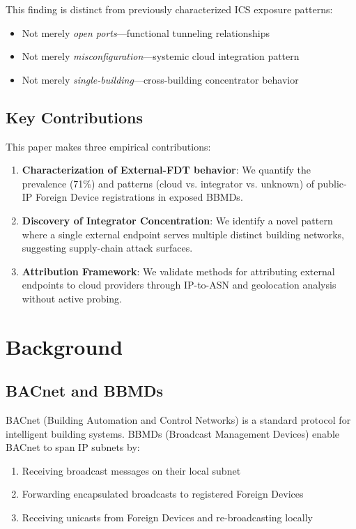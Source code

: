 \documentclass[11pt,a4paper]{article}
\begin{document}
This finding is distinct from previously characterized ICS exposure patterns:
\begin{itemize}
  \item Not merely \emph{open ports}---functional tunneling relationships
  \item Not merely \emph{misconfiguration}---systemic cloud integration pattern
  \item Not merely \emph{single-building}---cross-building concentrator behavior
\end{itemize}

\subsection{Key Contributions}

This paper makes three empirical contributions:

\begin{enumerate}
  \item \textbf{Characterization of External-FDT behavior}: We quantify the 
    prevalence (71\%) and patterns (cloud vs. integrator vs. unknown) of 
    public-IP Foreign Device registrations in exposed BBMDs.
    
  \item \textbf{Discovery of Integrator Concentration}: We identify a 
    novel pattern where a single external endpoint serves multiple 
    distinct building networks, suggesting supply-chain attack surfaces.
    
  \item \textbf{Attribution Framework}: We validate methods for 
    attributing external endpoints to cloud providers through IP-to-ASN 
    and geolocation analysis without active probing.
\end{enumerate}

\section{Background}
\label{sec:background}

\subsection{BACnet and BBMDs}

BACnet (Building Automation and Control Networks) is a standard protocol 
for intelligent building systems. BBMDs (Broadcast Management Devices) 
enable BACnet to span IP subnets by:

\begin{enumerate}
  \item Receiving broadcast messages on their local subnet
  \item Forwarding encapsulated broadcasts to registered Foreign Devices
  \item Receiving unicasts from Foreign Devices and re-broadcasting locally
\end{enumerate}
\end{document}
